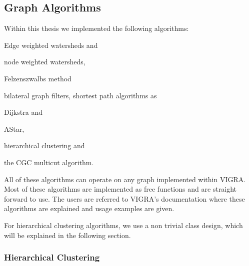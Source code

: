    





\subsection{Graph Algorithms} \label{sec:graph_graph_algorithms}
    
    Within this thesis we implemented the following algorithms:
    \begin{inparaenum}[(i)]
    \item Edge weighted watersheds and 
    \item node weighted watersheds,
    \item Felzenszwalbs method \cite{felzenszwalb_2004_ijcv}
    \item bilateral graph filters, shortest path algorithms
    as \item Dijkstra and \item AStar,
    \item hierarchical clustering and
    \item the CGC multicut algorithm.
    \end{inparaenum}


    All of these algorithms can operate on any graph implemented within VIGRA.
    Most of these algorithms are  implemented as free functions and are 
    straight forward to use.
    The users are referred to VIGRA's documentation where these
    algorithms are explained and usage examples are given.

    For hierarchical clustering algorithms, we use a non trivial 
    class design, which will be explained in the following section.


    \subsubsection{Hierarchical Clustering}

